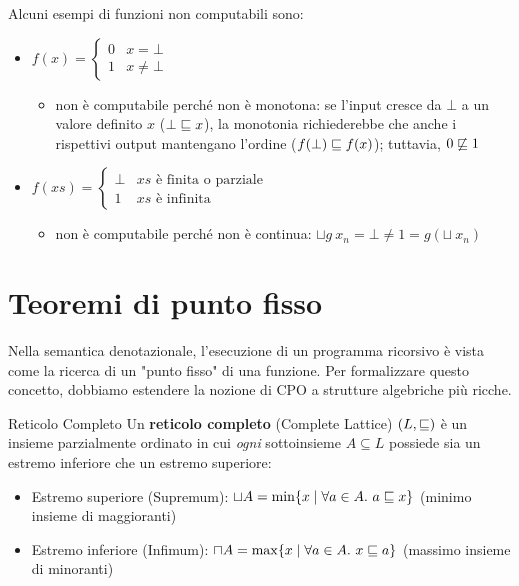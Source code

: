 Alcuni esempi di funzioni non computabili sono:
\begin{itemize}
    \item $
f(x) = \begin{cases}
    0 & x = \bot \\
    1 & x \neq \bot
\end{cases}
$
\begin{itemize}
    \item non è computabile perché non è monotona: se l'input cresce da $\bot$ a un valore definito $x$ ($\bot \sqsubseteq x$), la monotonia richiederebbe che anche i rispettivi output mantengano l'ordine ($f(\bot) \sqsubseteq f(x)$); tuttavia, $0 \not\sqsubseteq 1$
\end{itemize}

\item $
f(xs) = \begin{cases}
    \bot & xs \text{ è finita o parziale}\\
    1 & xs \text{ è infinita}
\end{cases}
$
\begin{itemize}
    \item non è computabile perché non è continua: $\sqcup g \ x_n = \bot \neq 1 = g(\sqcup \ x_n)$
\end{itemize}
\end{itemize}

\section{Teoremi di punto fisso}

Nella semantica denotazionale, l'esecuzione di un programma ricorsivo è vista come la ricerca di un "punto fisso" di una funzione. Per formalizzare questo concetto, dobbiamo estendere la nozione di CPO a strutture algebriche più ricche.

\begin{defframe}{Reticolo Completo}{}
    Un \textbf{reticolo completo} (Complete Lattice) $(L, \sqsubseteq)$ è un insieme parzialmente ordinato in cui \textit{ogni} sottoinsieme $A \subseteq L$ possiede sia un estremo inferiore che un estremo superiore:
    \begin{itemize}
        \item Estremo superiore (Supremum): $\sqcup A = \min \{ x \mid \forall a \in A.\ a \sqsubseteq x \}$ (minimo insieme di maggioranti)
        \item Estremo inferiore (Infimum): $\sqcap A = \max \{ x \mid \forall a \in A.\ x \sqsubseteq a \}$ (massimo insieme di minoranti)
    \end{itemize}
\end{defframe}

